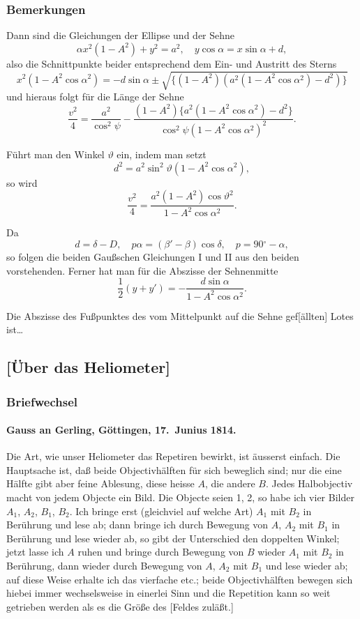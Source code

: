 \documentclass[12pt,a4paper]{article}
\newcommand{\degree}{\ensuremath{^\circ}}
\theoremstyle{plain}
\theoremstyle{definition}
\theoremstyle{remark}
\begin{document}
\newpage
\subsubsection*{Bemerkungen}

Dann sind die Gleichungen der Ellipse und der Sehne
\[
\alpha x^2(1 - A^2) + y^2 = a^2,\quad y\cos\alpha = x\sin\alpha + d,
\]
also die Schnittpunkte beider entsprechend dem Ein- und Austritt des Sterns
\[
x^2(1 - A^2\cos\alpha^2) = -d\sin\alpha \pm \sqrt{\{(1 - A^2)(a^2(1 - A^2\cos\alpha^2) - d^2)\}}
\]
und hieraus folgt für die Länge der Sehne
\[
\frac{v^2}{4} = \frac{a^2}{\cos^2\psi} - \frac{(1 - A^2)\{a^2(1 - A^2\cos\alpha^2) - d^2\}}{\cos^2\psi(1 - A^2\cos\alpha^2)^2}.
\]

Führt man den Winkel $\vartheta$ ein, indem man setzt
\[
d^2 = a^2\sin^2\vartheta(1 - A^2\cos\alpha^2),
\]
so wird
\[
\frac{v^2}{4} = \frac{a^2(1 - A^2)\cos\vartheta^2}{1 - A^2\cos\alpha^2}.
\]

Da
\[
d = \delta - D,\quad p\alpha = (\beta' - \beta)\cos\delta,\quad p = 90\degree - \alpha,
\]
so folgen die beiden Gaußschen Gleichungen I und II aus den beiden vorstehenden. Ferner hat man für die Abszisse der Sehnenmitte
\[
\frac{1}{2}(y + y') = -\frac{d\sin\alpha}{1 - A^2\cos\alpha^2}.
\]

Die Abszisse des Fußpunktes des vom Mittelpunkt auf die Sehne gef[ällten] Lotes ist\ldots

\newpage
\subsection*{[Über das Heliometer]}

\subsubsection*{Briefwechsel}

\paragraph{Gauss an Gerling, Göttingen, 17.~Junius 1814.}

Die Art, wie unser Heliometer das Repetiren bewirkt, ist äusserst einfach. Die Hauptsache ist, daß beide Objectivhälften für sich beweglich sind; nur die eine Hälfte gibt aber feine Ablesung, diese heisse $A$, die andere $B$. Jedes Halbobjectiv macht von jedem Objecte ein Bild. Die Objecte seien 1, 2, so habe ich vier Bilder $A_1$, $A_2$, $B_1$, $B_2$. Ich bringe erst (gleichviel auf welche Art) $A_1$ mit $B_2$ in Berührung und lese ab; dann bringe ich durch Bewegung von $A$, $A_2$ mit $B_1$ in Berührung und lese wieder ab, so gibt der Unterschied den doppelten Winkel; jetzt lasse ich $A$ ruhen und bringe durch Bewegung von $B$ wieder $A_1$ mit $B_2$ in Berührung, dann wieder durch Bewegung von $A$, $A_2$ mit $B_1$ und lese wieder ab; auf diese Weise erhalte ich das vierfache etc.; beide Objectivhälften bewegen sich hiebei immer wechselsweise in einerlei Sinn und die Repetition kann so weit getrieben werden als es die Größe des [Feldes zuläßt.]
\end{document}
